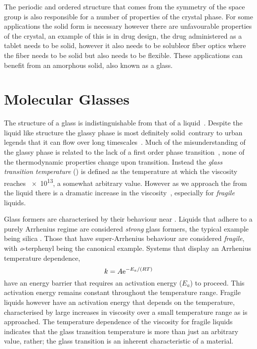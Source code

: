 
The periodic and ordered structure that comes from the symmetry of the space group is also responsible for a number of properties of the crystal phase. 
For some applications the solid form is necessary however there are unfavourable properties of the crystal, an example of this is in drug design, the drug administered as a tablet needs to be solid, however it also needs to be soluble\tocite or fiber optics where the fiber needs to be solid but also needs to be flexible\tocite. These applications can benefit from an amorphous solid, also known as a glass.

\section{Molecular Glasses}

The structure of a glass is indistinguishable from that of a liquid~\figref{}. Despite the liquid like structure the glassy phase is most definitely solid~\tocite contrary to urban legends that it can flow over long timescales~\tocite. Much of the misunderstanding of the glassy phase is related to the lack of a first order phase transition~\tocite, none of the thermodynamic properties change upon transition. Instead the \emph{glass transition temperature} (\si{\Tg}) is defined as the temperature at which the viscosity reaches \SI{e13}{\poise}, a somewhat arbitrary value. However as we approach the \si{\Tg} from the liquid there is a dramatic increase in the viscosity~\figref{}, especially for \emph{fragile} liquids.

Glass formers are characterised by their behaviour near \si{\Tg}. Liquids that adhere to a purely Arrhenius regime are considered \emph{strong} glass formers, the typical example being silica . Those that have super-Arrhenius behaviour are considered \emph{fragile}, with \emph{o}-terphenyl being the canonical example. Systems that display an Arrhenius temperature dependence,
\begin{equation}
    k = A \text{e}^{-E_a/(RT)}
\end{equation}
have an energy barrier that requires an activation energy ($E_a$) to proceed. This activation energy remains constant throughout the temperature range. Fragile liquids however have an activation energy that depends on the temperature\tocite, characterised by large increases in viscosity over a small temperature range as \si{\Tg} is approached. The temperature dependence of the viscosity for fragile liquids indicates that the glass transition temperature is more than just an arbitrary value, rather; the glass transition is an inherent characteristic of a material.

